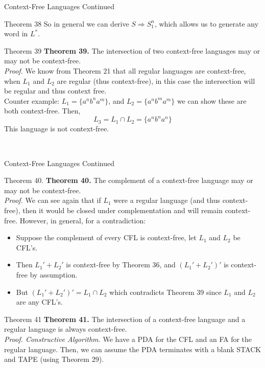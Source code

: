 \documentclass{article}
\begin{document}
\begin{multicols*}{3}
\begin{blackbox}{Context-Free Languages Continued}
\begin{redbox}{Theorem 38}
        So in general we can derive $S \Rightarrow S_1^n$, which allows us to generate any word in $L^*$.
    \end{redbox}
    \begin{bluebox}{Theorem 39}
        \textbf{Theorem 39.} The intersection of two context-free languages may or may not be context-free.\\[1ex]
        \textit{Proof.} We know from Theorem 21 that all regular languages are context-free, when $L_1$ and $L_2$ are regular (thus context-free), in this case the intersection 
        will be regular and thus context free.\\[1ex]
        Counter example: $L_1 = \{a^nb^na^m\}$, and $L_2 = \{a^nb^ma^m\}$ we can show these are both context-free. Then,\\[-3ex]
         \[L_3 = L_1 \cap L_2 = \{a^nb^na^n\}\]
         This language is not context-free.
    \end{bluebox}\\[-2ex]
\end{blackbox}
\begin{blackbox}{Context-Free Languages Continued}
    \begin{redbox}{Theorem 40.}
        \textbf{Theorem 40.} The complement of a context-free language may or may not be context-free.\\[1ex]
        \textit{Proof.} We can see again that if $L_1$ were a regular language (and thus context-free), then it would be closed under complementation and will remain context-free. However, in general, for a contradiction:
        \begin{itemize}[leftmargin=7pt]
            \item Suppose the complement of every CFL is context-free, let $L_1$ and $L_2$ be CFL's.
            \item Then $L_1' + L_2'$ is context-free by Theorem 36, and $(L_1'+L_2')'$ is context-free by assumption.
            \item But $(L_1'+L_2')' = L_1 \cap L_2$ which contradicts Theorem 39 since $L_1$ and $L_2$ are any CFL's.  
        \end{itemize}
    \end{redbox}
    \begin{brownbox}{Theorem 41}
        \textbf{Theorem 41.} The intersection of a context-free language and a regular language is always context-free.\\[1ex]
        \textit{Proof. Constructive Algorithm.} We have a PDA for the CFL and an FA for the regular language. Then, we can assume the PDA terminates with a blank STACK and TAPE (using Theorem 29). 

\end{brownbox}
\end{blackbox}
\end{multicols*}
\end{document}
